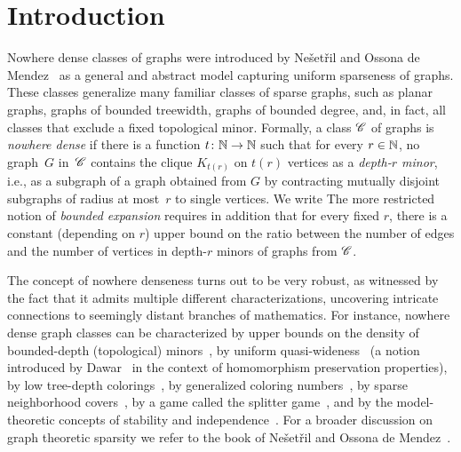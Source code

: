 \section{Introduction}\label{sec:intro}

Nowhere dense classes of graphs were introduced 
by Ne\v set\v ril and Ossona de 
Mendez~\cite{nevsetvril2010first,nevsetvril2011nowhere} as a 
general and abstract model
capturing uniform sparseness of graphs. These classes generalize many 
familiar classes of sparse graphs, such as planar graphs, graphs 
of bounded treewidth,  graphs of bounded degree, and, in fact, 
all classes that exclude a fixed 
topological minor.
Formally, a class $\mathscr{C}$ of graphs is {\em{nowhere dense}} if there is a function $t\colon \mathbb{N}\to \mathbb{N}$ such that for every $r\in \mathbb{N}$, 
no graph~$G$ in~$\mathscr{C}$ contains the clique $K_{t(r)}$ on $t(r)$ vertices as a {\em{depth-$r$ minor}},
i.e., as a subgraph of a graph obtained from $G$ by contracting mutually disjoint  subgraphs of radius at most~$r$ to single vertices. We write 
The more restricted notion of {\em{bounded expansion}} requires in addition that for every fixed $r$, there is a constant (depending on $r$) upper bound on the ratio 
between the number of edges and the number of vertices in depth-$r$ minors of graphs from $\mathscr{C}$.

The concept of nowhere denseness
turns out to be very robust, as witnessed by the fact that 
it admits multiple different characterizations, uncovering intricate connections to seemingly distant branches of mathematics.
For instance,  nowhere dense graph classes can be characterized 
by upper bounds on the density of bounded-depth (topological) 
minors~\cite{nevsetvril2010first,nevsetvril2011nowhere},
by uniform quasi-wideness~\cite{nevsetvril2011nowhere} (a notion introduced by
Dawar~\cite{dawar2010homomorphism} in the context of homomorphism
preservation properties), by low tree-depth
colorings~\cite{nevsetvril2008grad}, by generalized coloring
numbers~\cite{zhu2009coloring}, by sparse neighborhood
covers~\cite{GroheKRSS15,grohe2014deciding}, by a game called the
splitter game~\cite{grohe2014deciding}, and by the model-theoretic
concepts of stability and independence~\cite{adler2014interpreting}.
For a broader discussion on graph theoretic sparsity we refer to the book
of Ne\v{s}et\v{r}il and Ossona de Mendez~\cite{sparsity}.

